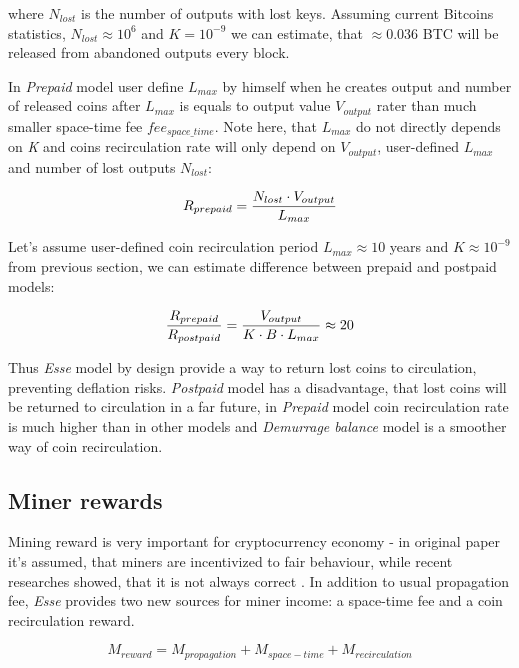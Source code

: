 \documentclass[]{article}   %
\newcommand{\esse}{\textit{Esse}}
\begin{document}
where $N_{lost}$ is the number of outputs with lost keys. Assuming current Bitcoins statistics, $N_{lost}\approx10^6$ and $K = 10^{-9}$ we can estimate, that $\approx0.036$ BTC will be released from abandoned outputs every block.

In \textit{Prepaid} model user define $L_{max}$ by himself when he creates output and number of released coins after $L_{max}$ is equals to output value $V_{output}$ rater than much smaller space-time fee $fee_{space\_time}$. Note here, that $L_{max}$ do not directly depends on \textit{K} and coins recirculation rate will only depend on $V_{output}$, user-defined $L_{max}$ and number of lost outputs $N_{lost}$:

\begin{equation}
R_{prepaid} = {N_{lost} \cdot V_{output} \over L_{max}}
\end{equation}

Let's assume user-defined coin recirculation period $L_{max}\approx10$ years and $K\approx10^{-9}$ from previous section, we can estimate difference between prepaid and postpaid models:

\begin{equation}
{R_{prepaid} \over R_{postpaid}} = { V_{output}  \over  K \cdot B \cdot L_{max}} \approx 20
\end{equation}

Thus \esse{} model by design provide a way to return lost coins to circulation, preventing deflation risks. \textit{Postpaid} model has a disadvantage, that lost coins will be returned to circulation in a far future, in \textit{Prepaid} model coin recirculation rate is much higher than in other models and \textit{Demurrage balance} model is a smoother way of coin recirculation.

\subsection{Miner rewards}
\label{minerrew}
Mining reward is very important for cryptocurrency economy - in original paper \cite{Nakamoto2008} it's assumed, that miners are incentivized to fair behaviour, while recent researches showed, that it is not always correct \cite{carlsten2016instability, eyal2014}. In addition to usual propagation fee, \esse{} provides two new sources for miner income: a space-time fee and a coin recirculation reward.

\begin{equation}
M_{reward} = M_{propagation} + M_{space-time} + M_{recirculation}
\end{equation}
\end{document}
